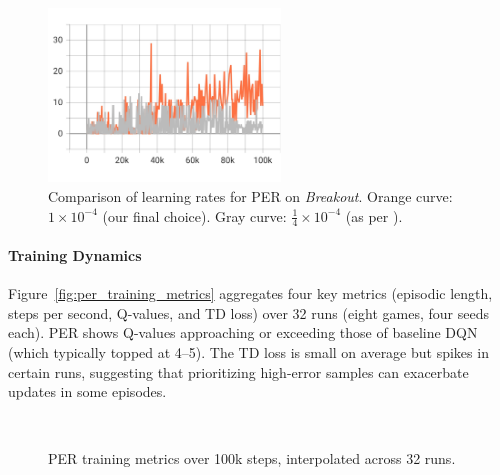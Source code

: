 \begin{figure}
	\centering
	\includegraphics[width=0.55\textwidth]{figures/per/png/per_lr_charts_episodic_return.jpeg}
	\caption{Comparison of learning rates for PER on \emph{Breakout}. 
		Orange curve: $1\times10^{-4}$ (our final choice). 
		Gray curve: $\tfrac{1}{4}\times10^{-4}$ (as per \cite{schaul:prioritized}).}
	\label{fig:per_lr_comparison}
\end{figure}

\paragraph{Training Dynamics}
Figure~\vref{fig:per_training_metrics} aggregates four key metrics (episodic length, steps per second, Q-values, and TD loss) over 32 runs (eight games, four seeds each). PER shows Q-values approaching or exceeding those of baseline DQN (which typically topped at 4--5). The TD loss is small on average but spikes in certain runs, suggesting that prioritizing high-error samples can exacerbate updates in some episodes.

\begin{figure}
	\centering
	\quad
	\\[1em]
	\quad
	\caption{PER training metrics over 100k steps, interpolated across 32 runs.}
	\label{fig:per_training_metrics}
\end{figure}

